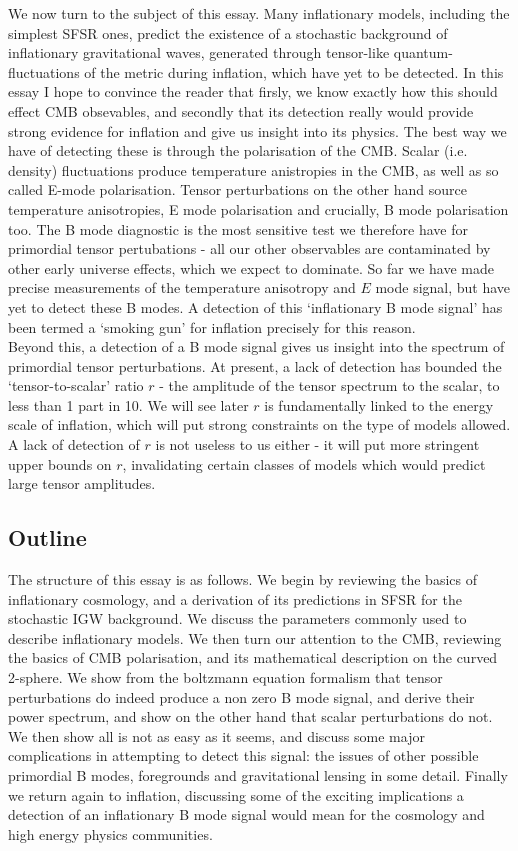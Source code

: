 \documentclass[a4paper,10pt]{article}
\begin{document}
We now turn to the subject of this essay. Many inflationary models, including the simplest SFSR ones, predict the existence of a stochastic background of inflationary gravitational waves, generated through tensor-like quantum-fluctuations of the metric during inflation, which have yet to be detected. In this essay I hope to convince the reader that firsly, we know exactly how this should effect CMB obsevables, and secondly that its detection really would provide strong evidence for inflation and give us insight into its physics. The best way we have of detecting these is through the polarisation of the CMB. Scalar (i.e. density) fluctuations produce temperature anistropies in the CMB, as well as so called E-mode polarisation. Tensor perturbations on the other hand source temperature anisotropies, E mode polarisation and crucially, B mode polarisation too. The B mode diagnostic is the most sensitive test we therefore have for primordial tensor pertubations - all our other observables are contaminated by other early universe effects, which we expect to dominate. So far we have made precise measurements of the temperature anisotropy and $E$ mode signal, but have yet to detect these B modes. A detection of this `inflationary B mode signal' has been termed a `smoking gun' for inflation precisely for this reason.\\

Beyond this, a detection of a B mode signal gives us insight into the spectrum of primordial tensor perturbations. At present, a lack of detection has bounded the `tensor-to-scalar' ratio $r$ - the amplitude of the tensor spectrum to the scalar, to less than 1 part in 10. We will see later $r$ is fundamentally linked to the energy scale of inflation, which will put strong constraints on the type of models allowed. A lack of detection of $r$ is not useless to us either - it will put more stringent upper bounds on $r$, invalidating certain classes of models which would predict large tensor amplitudes.\\

\subsection{Outline}

The structure of this essay is as follows. We begin by reviewing the basics of inflationary cosmology, and a derivation of its predictions in SFSR for the stochastic IGW background. We discuss the parameters commonly used to describe inflationary models. We then turn our attention to the CMB, reviewing the basics of CMB polarisation, and its mathematical description on the curved 2-sphere. We show from the boltzmann equation formalism that tensor perturbations do indeed produce a non zero B mode signal, and derive their power spectrum, and show on the other hand that scalar perturbations do not. We then show all is not as easy as it seems, and discuss some major complications in attempting to detect this signal: the issues of other possible primordial B modes, foregrounds and gravitational lensing in some detail. Finally we return again to inflation, discussing some of the exciting implications a detection of an inflationary B mode signal would mean for the cosmology and high energy physics communities. 
\end{document}
